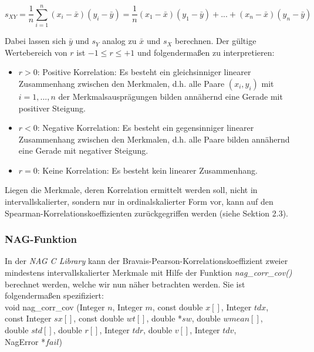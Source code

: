 \begin{equation*}
	s_{XY}=\dfrac{1}{n}\sum_{i=1}^{n}{(x_i-\bar{x})(y_i-\bar{y})}=\dfrac{1}{n}(x_1-\bar{x})(y_1-\bar{y})+...+(x_n-\bar{x})(y_n-\bar{y})
\end{equation*}

\noindent Dabei lassen sich $\bar{y}$ und $s_{Y}$ analog zu $\bar{x}$ und $s_{X}$ berechnen. Der gültige Wertebereich von $r$ ist $-1 \leq r \leq +1$ und folgendermaßen zu interpretieren:
\begin{itemize}
    \item $r>0$: Positive Korrelation: Es besteht ein gleichsinniger linearer Zusammenhang zwischen den Merkmalen, d.h. alle Paare $(x_i, y_i)$ mit $i=1,...,n$ der Merkmalsausprägungen bilden annähernd eine Gerade mit positiver Steigung.
    \item $r<0$: Negative Korrelation: Es besteht ein gegensinniger linearer Zusammenhang zwischen den Merkmalen, d.h. alle Paare bilden annähernd eine Gerade mit negativer Steigung.
    \item $r=0$: Keine Korrelation: Es besteht kein linearer Zusammenhang.
\end{itemize}

\noindent Liegen die Merkmale, deren Korrelation ermittelt werden soll, nicht in intervallskalierter, sondern nur in ordinalskalierter Form vor, kann auf den Spearman-Korrelationskoeffizienten zurückgegriffen werden (siehe Sektion 2.3).

\subsubsection{NAG-Funktion}

In der {\it NAG C Library} kann der Bravais-Pearson-Korrelationskoeffizient zweier mindestens intervallskalierter Merkmale mit Hilfe der Funktion {\it nag\_corr\_cov()} berechnet werden, welche wir nun näher betrachten werden. Sie ist folgendermaßen spezifiziert:\\

\noindent void nag\_corr\_cov (Integer $n$, Integer $m$, const double $x[]$, Integer $tdx$,\\
\hspace*{5mm} const Integer $sx[]$, const double $wt[]$, double *$sw$, double $wmean[]$,\\
\hspace*{5mm} double $std[]$, double $r[]$, Integer $tdr$, double $v[]$, Integer $tdv$,\\
\hspace*{5mm} NagError *$fail$)\\

